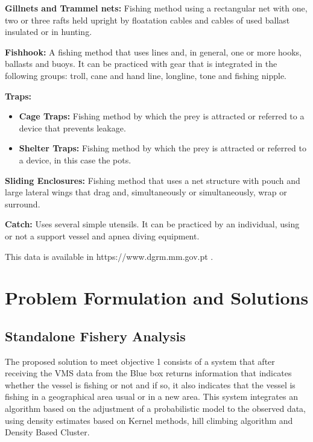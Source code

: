 \textbf{Gillnets and Trammel nets:}
Fishing method using a rectangular net with one, two or three rafts held upright by floatation cables and cables of used ballast insulated or in hunting.

\textbf{Fishhook:}
A fishing method that uses lines and, in general, one or more hooks, ballasts and buoys. It can be practiced with gear that is integrated in the following groups: troll, cane and hand line, longline, tone and fishing nipple.

\textbf{Traps:}
\begin{itemize}


\item \textbf{Cage Traps:} Fishing method by which the prey is attracted or referred to a device that prevents leakage. 
\item \textbf{Shelter Traps:} Fishing method by which the prey is attracted or referred to a device, in this case the pots.
\end{itemize}
\textbf{Sliding Enclosures:}
Fishing method that uses a net structure with pouch and large lateral wings that drag and, simultaneously or simultaneously, wrap or surround.

\textbf{Catch:}
Uses several simple utensils. It can be practiced by an individual, using or not a support vessel and apnea diving equipment.

This data is available in https://www.dgrm.mm.gov.pt \cite{WEBSITE:ArtesPesca}.




\section{Problem Formulation and Solutions} %
\label{sec:problem_int}

\subsection{Standalone Fishery Analysis} %
\label{sec:int_sfa}

The proposed solution to meet objective 1 consists of a system that after receiving the VMS data from the Blue box returns information that indicates whether the vessel is fishing or not and if so, it also indicates that the vessel is fishing in a geographical area usual or in a new area. This system integrates an algorithm based on the adjustment of a probabilistic model to the observed data, using density estimates based on Kernel methods, hill climbing algorithm and Density Based Cluster.

